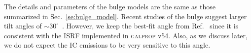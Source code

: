 \documentclass[doublespace,nopageskip]{VTthesis} %
\begin{document}
The details and parameters of the bulge models are the same as those summarized in Sec.~\ref{se:bulge_model}. Recent studies of the bulge suggest larger tilt angles of $\sim 30^\circ$~\cite{doi:10.1093/mnras/stt1045,Portail:2016vei}. However, we keep the best-fit angle from Ref.~\cite{Freudenreich:1997bx} since it is consistent with the ISRF implemented in \textsc{galprop} v54. Also, as we discuss later, we do not expect the IC emissions to be very sensitive to this angle.



\end{document}
